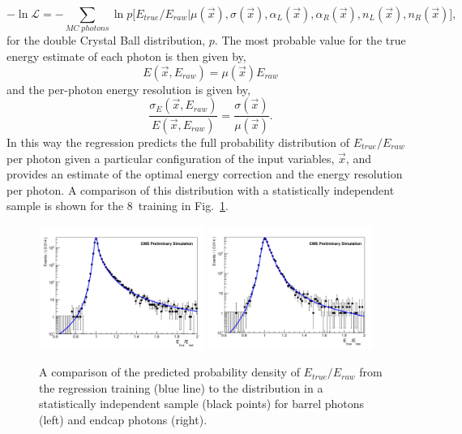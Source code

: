 \begin{equation}
  -\ln \mathcal{L} = - \sum_{MC \; photons} \ln p\bigl[E_{true}/E_{raw} | \mu(\vec{x}),\sigma(\vec{x}),\alpha_{L}(\vec{x}),\alpha_{R}(\vec{x}),n_{L}(\vec{x}),n_{R}(\vec{x})\bigr],
\end{equation}
for the double Crystal Ball distribution, $p$. The most probable value for the true energy estimate of each photon is then given by,
\begin{equation}
  E(\vec{x},E_{raw}) = \mu(\vec{x})E_{raw}
\end{equation}
and the per-photon energy resolution is given by, 
\begin{equation}
  \frac{\sigma_{E}(\vec{x},E_{raw})}{E(\vec{x},E_{raw})} = \frac{\sigma(\vec{x})}{\mu(\vec{x})}.
\end{equation}
In this way the regression predicts the full probability distribution of $E_{true}/E_{raw}$ per photon given a particular configuration of the input variables, $\vec{x}$, and provides an estimate of the optimal energy correction and the energy resolution per photon. A comparison of this distribution with a statistically independent \MC sample is shown for the 8~\TeV training in Fig.~\ref{fig:regression_training}. 

\begin{figure}
  \includegraphics[width=0.48\textwidth]{analysis_comps/plots/regression_barrel_fix.pdf}
  \includegraphics[width=0.48\textwidth]{analysis_comps/plots/regression_endcap_fix.pdf}
  \caption[A comparison of the predicted probability density of $E_{true}/E_{raw}$ from the regression training to the distribution in a statistically independent sample]{A comparison of the predicted probability density of $E_{true}/E_{raw}$ from the regression training (blue line) to the distribution in a statistically independent \MC sample (black points) for barrel photons (left) and endcap photons (right).}
  \label{fig:regression_training}
\end{figure}

